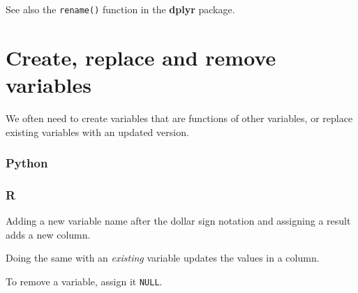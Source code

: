 \documentclass[
]{book}
\newenvironment{Shaded}{\begin{snugshade}}{\end{snugshade}}
\newcommand{\CommentTok}[1]{\textcolor[rgb]{0.56,0.35,0.01}{\textit{#1}}}
\newcommand{\DecValTok}[1]{\textcolor[rgb]{0.00,0.00,0.81}{#1}}
\newcommand{\ErrorTok}[1]{\textcolor[rgb]{0.64,0.00,0.00}{\textbf{#1}}}
\newcommand{\FloatTok}[1]{\textcolor[rgb]{0.00,0.00,0.81}{#1}}
\newcommand{\NormalTok}[1]{#1}
\newcommand{\OtherTok}[1]{\textcolor[rgb]{0.56,0.35,0.01}{#1}}
\newcommand{\SpecialCharTok}[1]{\textcolor[rgb]{0.00,0.00,0.00}{#1}}
\begin{document}
See also the \texttt{rename()} function in the \textbf{dplyr} package.

\hypertarget{create-replace-and-remove-variables}{%
\section{Create, replace and remove variables}\label{create-replace-and-remove-variables}}

We often need to create variables that are functions of other variables, or replace existing variables with an updated version.

\hypertarget{python-17}{%
\subsubsection*{Python}\label{python-17}}

\hypertarget{r-17}{%
\subsubsection*{R}\label{r-17}}

Adding a new variable name after the dollar sign notation and assigning a result adds a new column.

\begin{Shaded}
\end{Shaded}

Doing the same with an \emph{existing} variable updates the values in a column.

\begin{Shaded}
\end{Shaded}

To remove a variable, assign it \texttt{NULL}.
\end{document}
